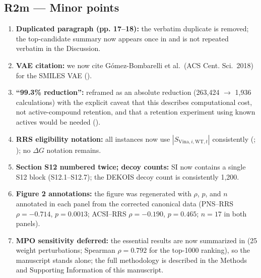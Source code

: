 \documentclass[11pt]{article}
\begin{document}
\subsection*{R2m --- Minor points}
\begin{enumerate}[leftmargin=1.6em]
\item \textbf{Duplicated paragraph (pp. 17--18):} the verbatim duplicate is removed; the
top-candidate summary now appears once in  and is not repeated verbatim in the
Discussion.
\item \textbf{VAE citation:} we now cite G\'omez-Bombarelli et al.\ (ACS Cent. Sci.\ 2018)
for the SMILES VAE ().
\item \textbf{``99.3\% reduction'':} reframed as an absolute reduction (263{,}424 $\rightarrow$
1{,}936 calculations) with the explicit caveat that this describes computational cost, not
active-compound retention, and that a retention experiment using known actives would be needed
().
\item \textbf{RRS eligibility notation:} all instances now use $|S_{\mathrm{Vina},i,\mathrm{WT},t}|$
consistently (; ); no $\Delta G$ notation remains.
\item \textbf{Section S12 numbered twice; decoy counts:} SI now contains a single S12 block
(S12.1--S12.7); the DEKOIS decoy count is consistently 1{,}200.
\item \textbf{Figure 2 annotations:} the figure was regenerated with $\rho$, $p$, and $n$
annotated in each panel from the corrected canonical data (PNS--RRS $\rho=-0.714$,
$p=0.0013$; ACSI--RRS $\rho=-0.190$, $p=0.465$; $n=17$ in both panels).
\item \textbf{MPO sensitivity deferred:} the essential results are now summarized in 
(25 weight perturbations; Spearman $\rho=0.792$ for the top-1000 ranking), so the manuscript
stands alone; the full methodology is described in the Methods and Supporting Information of this manuscript.
\end{enumerate}
\end{document}
